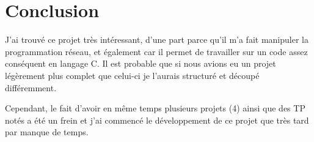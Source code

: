 \chapter{Conclusion}

J'ai trouvé ce projet très intéressant, 
	d'une part parce qu'il m'a fait manipuler la programmation réseau, 
	et également car il permet de travailler 
sur un code assez conséquent en langage C.
Il est probable que si nous avions eu un projet légèrement plus complet
que celui-ci je l'aurais structuré et découpé différemment.

Cependant, le fait d'avoir en même temps plusieurs projets (4) ainsi 
que des TP notés a été un frein et j'ai commencé le développement de 
ce projet que très tard par manque de temps.
